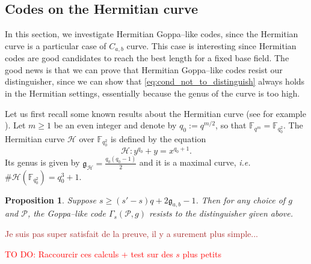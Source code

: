 \documentclass[a4paper]{article}
\newtheorem{proposition}[thm]{Proposition}
\theoremstyle{definition}
\theoremstyle{remark}
\newcommand{\calP}{\mathcal{P}}
\newcommand{\calH}{\mathcal{H}}
\newcommand{\fqm}{\mathbb{F}_{q^m}}
\newcommand{\fqo}{\mathbb{F}_{q_0^2}}
\newcommand\TODO[1]{\textcolor{red}{TO DO: #1}}
\newcommand\mathieu[1]{\textcolor{brown}{#1}}
\begin{document}
\subsection{Codes on the Hermitian curve}

In this section, we investigate Hermitian Goppa--like codes, since the Hermitian curve is a particular case of $C_{a,b}$ curve. This case is interesting since Hermitian codes are good candidates to reach the best length for a fixed base field. The good news is that we can prove that Hermitian Goppa--like codes resist our distinguisher, since we can show that \eqref{eq:cond_not_to_distinguish} always holds in the Hermitian settings, essentially because  the genus of the curve is too high. 

\noindent Let us first recall some known results about the Hermitian curve (see for example \cite{Sti09}). Let $m \geq 1$  be an even integer and denote by $q_0 := q^{m/2}$, so that $\fqm = \fqo$. The Hermitian curve $\calH$ over $\fqo$ is defined by the equation
$$\calH : y^{q_0}+y = x^{q_0+1}.$$
Its genus is given by $\mathfrak{g}_{\calH} = \frac{q_0(q_0-1)}{2}$ and it is a maximal curve, \emph{i.e.} $\#\calH(\fqo) = q_0^3+1$.


\begin{proposition} \label{prop:Hermitian_Goppa_like_are_secured}
    Suppose $s \geq (s'-s)q+2\mathfrak{g}_{a,b}-1$. Then for any choice of $g$ and $\calP$, the Goppa--like code $\Gamma_s(\calP,g)$ resists to the distinguisher given above.
\end{proposition}

\mathieu{Je suis pas super satisfait de la preuve, il y a surement plus simple...}

\TODO{Raccourcir ces calculs + test sur des $s$ plus petits}
\end{document}
